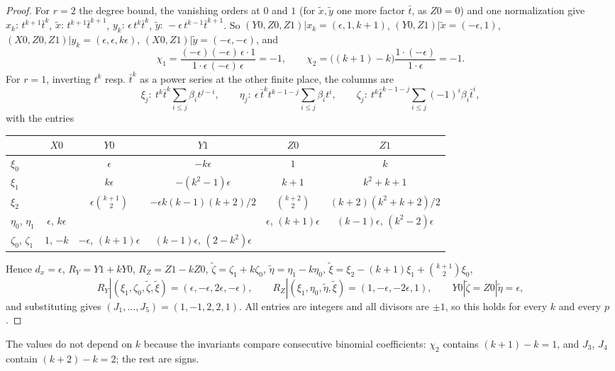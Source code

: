 \documentclass[11pt]{amsart}
\theoremstyle{definition}
\theoremstyle{plain}
\begin{document}
\begin{proof}
For $r=2$ the degree bound, the vanishing orders at $0$ and $1$ (for $\tilde x,\tilde y$ one more factor $\bar t$, as $Z0=0$) and one normalization give $x_k:\,t^{k+1}\bar t^k$, $\tilde x:\,t^{k+1}\bar t^{k+1}$, $y_k:\,\epsilon\,t^k\bar t^k$, $\tilde y:\,-\epsilon\,t^{k-1}\bar t^{k+1}$. So $(Y0,Z0,Z1)|x_k=(\epsilon,1,k+1)$, $(Y0,Z1)|\tilde x=(-\epsilon,1)$, $(X0,Z0,Z1)|y_k=(\epsilon,\epsilon,k\epsilon)$, $(X0,Z1)|\tilde y=(-\epsilon,-\epsilon)$, and
\[
\chi_1=\frac{(-\epsilon)(-\epsilon)\,\epsilon\cdot1}{1\cdot\epsilon\,(-\epsilon)\,\epsilon}=-1,\qquad \chi_2=\bigl((k+1)-k\bigr)\frac{1\cdot(-\epsilon)}{1\cdot\epsilon}=-1.
\]
For $r=1$, inverting $t^k$ resp. $\bar t^k$ as a power series at the other finite place, the columns are
\[
\xi_j:\ t^k\bar t^k\textstyle\sum_{i\le j}\beta_it^{j-i},\qquad \eta_j:\ \epsilon\,\bar t^kt^{k-1-j}\sum_{i\le j}\beta_it^i,\qquad \zeta_j:\ t^k\bar t^{k-1-j}\sum_{i\le j}(-1)^i\beta_i\bar t^i,
\]
with the entries
\begin{center}\small
\begin{tabular}{@{}lccccc@{}}
\toprule
 & $X0$ & $Y0$ & $Y1$ & $Z0$ & $Z1$\\
\midrule
$\xi_0$ & & $\epsilon$ & $-k\epsilon$ & $1$ & $k$\\
$\xi_1$ & & $k\epsilon$ & $-(k^2-1)\epsilon$ & $k+1$ & $k^2+k+1$\\
$\xi_2$ & & $\epsilon\binom{k+1}2$ & $-\epsilon k(k-1)(k+2)/2$ & $\binom{k+2}2$ & $(k+2)(k^2+k+2)/2$\\
$\eta_0$, $\eta_1$ & $\epsilon$, $k\epsilon$ & & & $\epsilon$, $(k+1)\epsilon$ & $(k-1)\epsilon$, $(k^2-2)\epsilon$\\
$\zeta_0$, $\zeta_1$ & $1$, $-k$ & $-\epsilon$, $(k+1)\epsilon$ & $(k-1)\epsilon$, $(2-k^2)\epsilon$ & & \\
\bottomrule
\end{tabular}
\end{center}
Hence $d_x=\epsilon$, $R_Y=Y1+kY0$, $R_Z=Z1-kZ0$, $\tilde\zeta=\zeta_1+k\zeta_0$, $\tilde\eta=\eta_1-k\eta_0$, $\tilde\xi=\xi_2-(k+1)\xi_1+\binom{k+1}2\xi_0$,
\[
R_Y|(\xi_1,\zeta_0,\tilde\zeta,\tilde\xi)=(\epsilon,-\epsilon,2\epsilon,-\epsilon),\qquad R_Z|(\xi_1,\eta_0,\tilde\eta,\tilde\xi)=(1,-\epsilon,-2\epsilon,1),\qquad Y0|\tilde\zeta=Z0|\tilde\eta=\epsilon,
\]
and substituting gives $(J_1,\dots,J_5)=(1,-1,2,2,1)$. All entries are integers and all divisors are $\pm1$, so this holds for every $k$ and every $p$.
\end{proof}

The values do not depend on $k$ because the invariants compare consecutive binomial coefficients: $\chi_2$ contains $(k+1)-k=1$, and $J_3$, $J_4$ contain $(k+2)-k=2$; the rest are signs.
\end{document}
